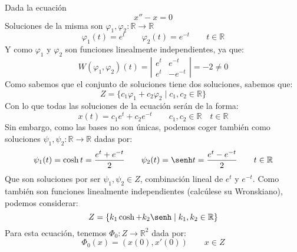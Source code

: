 \begin{ejemplo}
    Dada la ecuación
    \begin{equation*}
        x'' - x = 0
    \end{equation*}
    Soluciones de la misma son $\varphi_1,\varphi_2:\mathbb{R}\rightarrow\mathbb{R}$
    \begin{equation*}
        \varphi_1(t) = e^t \qquad \varphi_2(t) = e^{-t} \qquad t\in \mathbb{R}
    \end{equation*}
    Y como $\varphi_1$ y $\varphi_2$ son funciones linealmente independientes, ya que:
    \begin{equation*}
        W(\varphi_1,\varphi_2)(t) = \left|\begin{array}{cc}
            e^t & e^{-t} \\
            e^t & -e^{-t} 
        \end{array}\right| = -2  \neq 0
    \end{equation*}
    Como sabemos que el conjunto de soluciones tiene dos soluciones, sabemos que:
    \begin{equation*}
        Z = \{c_1 \varphi_1 + c_2 \varphi_2 \mid c_1,c_2 \in \mathbb{R}\}
    \end{equation*}
    Con lo que todas las soluciones de la ecuación serán de la forma:
    \begin{equation*}
        x(t) = c_1 e^t + c_2 e^{-t} \qquad c_1,c_2\in \mathbb{R} \quad t\in \mathbb{R}
    \end{equation*}
    Sin embargo, como las bases no son únicas, podemos coger también como soluciones $\psi_1,\psi_2:\mathbb{R}\rightarrow\mathbb{R}$ dadas por:
    \begin{equation*}
        \psi_1(t) = \cosh t = \dfrac{e^t + e^{-t}}{2} \qquad \psi_2(t) = \senh t = \dfrac{e^t - e^{-t}}{2} \qquad t\in \mathbb{R}
    \end{equation*}
    Que son soluciones por ser $\psi_1,\psi_2\in Z$, combinación lineal de $e^t$ y $e^{-t}$. Como también son funciones linealmente independientes (calcúlese su Wronskiano), podemos considerar:
    \begin{equation*}
        Z = \{k_1 \cosh  + k_2 \senh  \mid k_1,k_2 \in \mathbb{R}\}
    \end{equation*}
    Para esta ecuación, tenemos $\Phi_{0}:Z\rightarrow\mathbb{R}^2$ dada por:
    \begin{equation*}
        \Phi_0(x) = (x(0), x'(0)) \qquad x\in Z
    \end{equation*}


\end{ejemplo}
